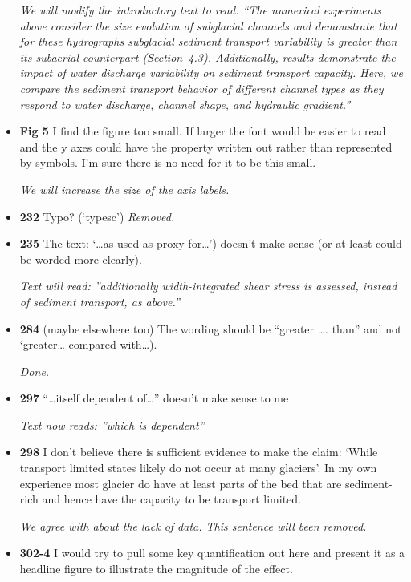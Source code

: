 \documentclass[11pt]{article}
\begin{document}
\begin{itemize}
  \textit{We will modify the introductory text to read: ``The numerical experiments above consider the size evolution of subglacial channels and demonstrate that for these hydrographs subglacial sediment transport variability is greater than its subaerial counterpart (Section~4.3). 
Additionally, results demonstrate the impact of water discharge variability on sediment transport capacity.
Here, we compare the sediment transport behavior of different channel types as they respond to water discharge, channel shape, and hydraulic gradient.''
}

\item \textbf{Fig 5} I find the figure too small. If larger the font would be easier to read and the
  y axes could have the property written out rather than represented by
  symbols. I’m sure there is no need for it to be this small.

  \textit{We will increase the size of the axis labels.}

\item \textbf{232} Typo? (‘typesc’)
  \textit{Removed.}
  
\item \textbf{235} The text: ‘…as used as proxy for…’) doesn’t make sense (or at least could be
  worded more clearly).

\textit{Text will read: ''additionally width-integrated shear stress is assessed, instead of sediment transport, as above.''}
  
\item \textbf{284} (maybe
  elsewhere too)
  The wording should be “greater …. than” and not ‘greater… compared
  with…).

  \textit{Done.}

\item \textbf{297} “…itself dependent of…” doesn’t make sense to me

  \textit{Text now reads: ''which is dependent''}

\item \textbf{298} I don’t believe there is sufficient evidence to make the claim: ‘While
  transport limited states likely do not occur at many glaciers’. In my own
  experience most glacier do have at least parts of the bed that are sediment-
  rich and hence have the capacity to be transport limited.

  \textit{We agree with  about the lack of data. This sentence will been removed. }


  
\item \textbf{302-4} I would try to pull some key quantification out here and present it as a
  headline figure to illustrate the magnitude of the effect.


\end{itemize}
\end{document}
